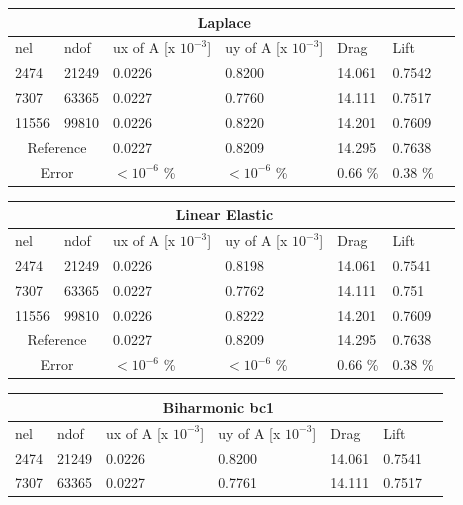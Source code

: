 \begin{table}[h!]
\centering
\label{FSI-1 Results}
\begin{tabular}{ |p{1cm}||p{1cm}|p{2.8cm}|p{2.8cm}|p{2.7cm}|p{2.7cm}|p{1.2cm}|}
 \hline
  \multicolumn{6}{|c|}{Laplace} \\
   \hline
nel & ndof & ux of A [x $10^{-3}$]  &uy of A [x $10^{-3}$]& Drag  & Lift \\
 \hline
 2474    & 21249  &       0.0226 &       0.8200 & 14.061 & 0.7542 \\
 7307    & 63365  &       0.0227 &       0.7760 & 14.111 & 0.7517 \\
 11556   & 99810  &       0.0226 &      0.8220 & 14.201 & 0.7609 \\
  \hline
 \multicolumn{2}{|c|}{Reference} &  0.0227      &       0.8209      & 14.295  & 0.7638   \\
 \hline
     \multicolumn{2}{|c|}{Error}  & $ < 10^{-6}$  \% &  $ <10^{-6}$  \% & 0.66 \% & 0.38 \% \\
   \hline
\end{tabular}
\begin{tabular}{ |p{1cm}||p{1cm}|p{2.8cm}|p{2.8cm}|p{2.7cm}|p{2.7cm}|p{1.2cm}|}
 \hline
  \multicolumn{6}{|c|}{Linear Elastic} \\
   \hline
nel & ndof & ux of A [x $10^{-3}$]  &uy of A [x $10^{-3}$]& Drag  & Lift \\
 \hline
 2474    & 21249  &       0.0226 &       0.8198 & 14.061 & 0.7541 \\
 7307    & 63365  &       0.0227 &       0.7762 & 14.111 & 0.751  \\
 11556   & 99810  &       0.0226  &       0.8222 & 14.201 & 0.7609 \\
  \hline
 \multicolumn{2}{|c|}{Reference} &  0.0227      &       0.8209      & 14.295  & 0.7638   \\
 \hline
    \multicolumn{2}{|c|}{Error}  &$ < 10^{-6}$  \% &  $ <10^{-6}$  \%  & 0.66 \% & 0.38 \% \\
 \hline
\end{tabular}
\begin{tabular}{ |p{1cm}||p{1cm}|p{2.8cm}|p{2.8cm}|p{2.7cm}|p{2.7cm}|p{1.2cm}|}
 \hline
  \multicolumn{6}{|c|}{Biharmonic bc1} \\
   \hline
nel & ndof & ux of A [x $10^{-3}$]  &uy of A [x $10^{-3}$]& Drag  & Lift \\
 \hline
 2474    & 21249  &       0.0226 &       0.8200 & 14.061 & 0.7541 \\
 7307    & 63365  &       0.0227  &       0.7761 & 14.111 & 0.7517 \\

\end{tabular}
\end{table}
